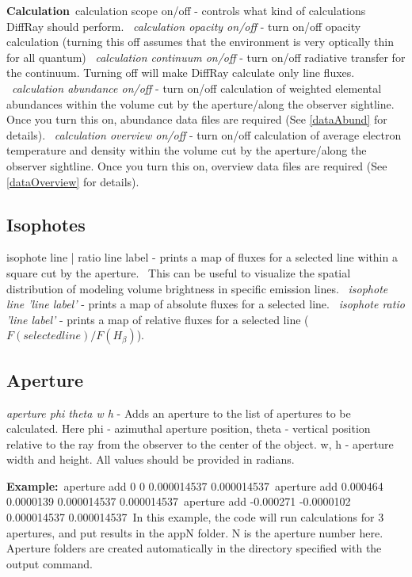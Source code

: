 \documentclass[a4paper]{article}
\begin{document}
{\bf Calculation}\
calculation {scope} on/off - controls what kind of calculations DiffRay should perform. \
    {\it calculation opacity on/off} - turn on/off opacity calculation (turning this off assumes that the environment is very optically thin for all
quantum) \
    {\it calculation continuum on/off} - turn on/off radiative transfer for the continuum. Turning off will make DiffRay calculate only line fluxes. \
    {\it calculation abundance on/off} - turn on/off calculation of weighted elemental abundances within the volume cut by the aperture/along the observer sightline. Once you turn this on,
abundance data files are required (See \ref{dataAbund} for details). \
    {\it calculation overview on/off} - turn on/off calculation of average electron temperature and density within the volume cut by the aperture/along the observer sightline. Once you turn this on,
overview data files are required (See \ref{dataOverview} for details). \

\subsection{Isophotes}
isophote {line | ratio} {line label} - prints a map of fluxes for a selected line within a square cut by the aperture. \
This can be useful to visualize the spatial distribution of modeling volume brightness in specific emission lines. \
    {\it isophote line 'line label'} - prints a map of absolute fluxes for a selected line. \
    {\it isophote ratio 'line label'} - prints a map of relative fluxes for a selected line ($F(selected line)/F(H_{\beta})$). \

\subsection{Aperture}

{\it aperture phi theta w h} - Adds an aperture to the list of apertures to be calculated.
Here phi - azimuthal aperture position, theta - vertical position relative to the ray
from the observer to the center of the object. w, h - aperture width and height. All values
should be provided in radians.\

    {\bf Example:}\
aperture add 0 0 0.000014537 0.000014537\
aperture add 0.000464 0.0000139 0.000014537 0.000014537\
aperture add -0.000271 -0.0000102 0.000014537 0.000014537\
In this example, the code will run calculations for 3 apertures, and put results in the
app{N} folder. N is the aperture number here. Aperture folders are created automatically
in the directory specified with the output command.
\end{document}
